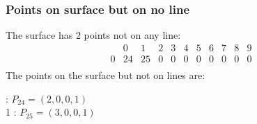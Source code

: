 \documentclass{article}
\begin{document}
{\subsubsection*{Points on surface but on no line}
The surface has 2 points not on any line:\\
$$
\begin{array}{r|*{10}{r}}
 & 0 & 1 & 2 & 3 & 4 & 5 & 6 & 7 & 8 & 9\\
\hline
0 & 24 & 25 & 0 & 0 & 0 & 0 & 0 & 0 & 0 & 0\\
\end{array}
$$
The points on the surface but not on lines are:\\
\begin{multicols}{2}
 : $P_{24}=( 2, 0, 0, 1 )$\\
1 : $P_{25}=( 3, 0, 0, 1 )$\\
\end{multicols}
}
\end{document}
